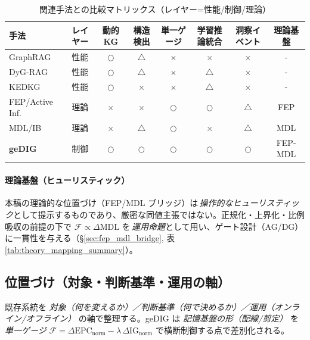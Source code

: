 \documentclass[ja=standard,xelatex]{bxjsarticle}
\newcommand{\F}{\mathcal{F}}
\newcommand{\gednorm}{\Delta\mathrm{EPC}_{\mathrm{norm}}}
\newcommand{\ignorm}{\Delta\mathrm{IG}_{\mathrm{norm}}}
\begin{document}
\begin{table}[H]
\centering
\caption{関連手法との比較マトリックス（レイヤー=性能/制御/理論）}
\label{tab:related_comparison}
\small
\begin{tabular}{lccccccc}
\toprule
手法 & レイヤー & 動的KG & 構造検出 & 単一ゲージ & 学習推論統合 & 洞察イベント & 理論基盤 \\
\midrule
GraphRAG & 性能 & $\bigcirc$ & $\triangle$ & $\times$ & $\times$ & $\times$ & - \\
DyG-RAG & 性能 & $\bigcirc$ & $\triangle$ & $\times$ & $\triangle$ & $\times$ & - \\
KEDKG & 性能 & $\bigcirc$ & $\times$ & $\times$ & $\triangle$ & $\times$ & - \\
FEP/Active Inf. & 理論 & $\times$ & $\times$ & $\bigcirc$ & $\bigcirc$ & $\triangle$ & FEP \\
MDL/IB & 理論 & $\times$ & $\triangle$ & $\bigcirc$ & $\times$ & $\triangle$ & MDL \\
\textbf{geDIG} & 制御 & $\bigcirc$ & $\bigcirc$ & $\bigcirc$ & $\bigcirc$ & $\bigcirc$ & FEP-MDL \\
\bottomrule
\end{tabular}
\end{table}

\paragraph{理論基盤（ヒューリスティック）}
本稿の理論的な位置づけ（FEP/MDL ブリッジ）は\,\emph{操作的なヒューリスティック}として提示するものであり、厳密な同値主張ではない。正規化・上界化・比例吸収の前提の下で $\F\propto\Delta\mathrm{MDL}$ を\,\emph{運用命題}として用い、ゲート設計（AG/DG）に一貫性を与える（\S\ref{sec:fep_mdl_bridge}, 表\ref{tab:theory_mapping_summary}）。



\subsection{位置づけ（対象・判断基準・運用の軸）}
\label{sec:positioning_axes}
既存系統を \emph{対象（何を変えるか）／判断基準（何で決めるか）／運用（オンライン/オフライン）} の軸で整理する。geDIG は \emph{記憶基盤の形（配線/剪定）} を \emph{単一ゲージ} $\F=\gednorm-\lambda\,\ignorm$ で横断制御する点で差別化される。
\end{document}
